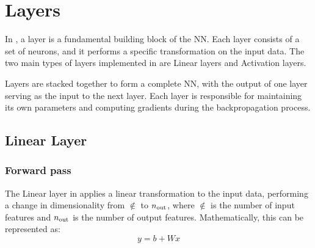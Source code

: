 \section{Layers}

In \mfnet, a layer is a fundamental building block of the \acl{NN}. Each layer consists of a set of neurons, and it performs a specific transformation on the input data. The two main types of layers implemented in \mfnet are Linear layers and Activation layers.


Layers are stacked together to form a complete \acl{NN}, with the output of one layer serving as the input to the next layer.  Each layer is responsible for maintaining its own parameters and computing gradients during the backpropagation process.


\subsection{Linear Layer}
\subsubsection{Forward pass}
The Linear layer in \mfnet applies a linear transformation to the input data, performing a change in dimensionality from $\nin$ to $n_\text{out}$, where $\nin$ is the number of input features and $n_\text{out}$ is the number of output features. Mathematically, this can be represented as:
\begin{equation}
    y = b + Wx
\end{equation}

